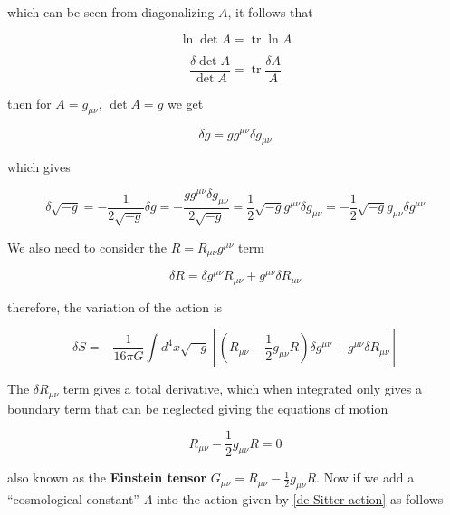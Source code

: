 \documentclass[a4paper,11pt]{article}
\numberwithin{equation}{section}
\numberwithin{figure}{section}
\begin{document}
\begin{large}
which can be seen from diagonalizing $A$, it follows that

\begin{equation}
\label{ln det A}    
    \ln \det A= \operatorname{tr} \ln A
\end{equation}

\begin{equation}
 \label{delta det A}   
    \frac{\delta \det A}{\det A} = \operatorname{tr} \frac{\delta A}{A}
\end{equation}


then for $A=g_{\mu \nu}$, $\det A=g$ we get


\begin{equation}
\label{delta g}    
    \delta g=g g^{\mu \nu} \delta g_{\mu \nu}
\end{equation}

\newpage

which gives

\begin{equation}
\label{delta rt -g}    
    \delta \sqrt{-g}= -\frac{1}{2\sqrt{-g}}\delta g= -\frac{gg^{\mu \nu} \delta g_{\mu \nu}}{2\sqrt{-g}}=\frac{1}{2}\sqrt{-g} g^{\mu \nu} \delta g_{\mu \nu}=-\frac{1}{2}\sqrt{-g} g_{\mu \nu} \delta g^{\mu \nu}
\end{equation}


We also need to consider the $R=R_{\mu \nu} g^{\mu \nu}$ term

\begin{equation}
\label{delta R}
    \delta R= \delta g^{\mu \nu} R_{\mu \nu}+g^{\mu \nu} \delta R_{\mu \nu}
\end{equation}

therefore, the variation of the action is

\begin{equation}
\label{variation of action}
    \delta S= - \frac{1}{16\pi G} \int d^4x \sqrt{-g} [(R_{\mu \nu} -\frac{1}{2} g_{\mu \nu} R)\delta g^{\mu \nu}+g^{\mu \nu}\delta R_{\mu \nu}]
\end{equation}



The $\delta R_{\mu \nu}$ term gives a total derivative, which when integrated only gives a boundary term that can be neglected giving the equations of motion


\begin{equation}
\label{Einstein tensor}
    R_{\mu \nu}-\frac{1}{2}g_{\mu \nu} R=0
\end{equation}

also known as the \textbf{Einstein tensor} $G_{\mu \nu}= R_{\mu \nu}-\frac{1}{2}g_{\mu \nu} R$. Now if we add a ``cosmological constant'' $\Lambda$ into the action given by \eqref{de Sitter action} as follows


\end{large}
\end{document}
